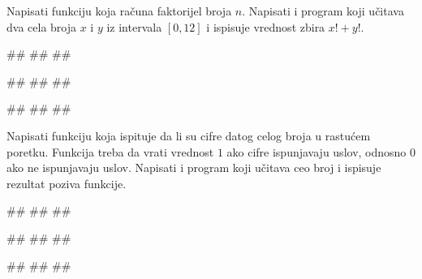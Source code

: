 \begin{Exercise}[label=p1.4_13] 
Napisati funkciju  koja računa faktorijel
broja $n$. Napisati i program koji učitava dva cela broja $x$ i $y$ iz
intervala $[0,12]$ i ispisuje vrednost zbira $x!+y!$.
 
\begin{miditest}
\begin{upotreba}{1}
#\naslovInt#
##
##
\end{upotreba}
\end{miditest}
\begin{miditest}
\begin{upotreba}{2}
#\naslovInt#
##
##
\end{upotreba}
\end{miditest}

\begin{miditest}
\begin{upotreba}{3}
#\naslovInt#
##
##
\end{upotreba}
\end{miditest}

\end{Exercise}
\begin{Answer}[ref=p1.4_13]
\end{Answer}

\begin{Exercise}[label=p1.4_14] 
Napisati funkciju  koja ispituje da li su
cifre datog celog broja u rastućem poretku. Funkcija treba da vrati
vrednost $1$ ako cifre ispunjavaju uslov, odnosno $0$ ako ne
ispunjavaju uslov. Napisati i program koji učitava ceo broj i ispisuje
rezultat poziva funkcije.

\begin{miditest}
\begin{upotreba}{1}
#\naslovInt#
##
##
\end{upotreba}
\end{miditest}
\begin{miditest}
\begin{upotreba}{2}
#\naslovInt#
##
##
\end{upotreba}
\end{miditest}

\begin{miditest}
\begin{upotreba}{3}
#\naslovInt#
##
##
\end{upotreba}
\end{miditest}

\end{Exercise}
\begin{Answer}[ref=p1.4_14]
\end{Answer}

